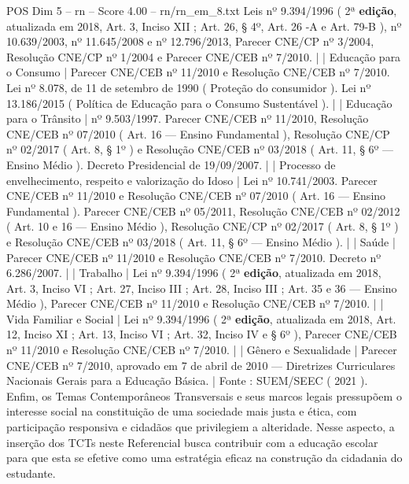 \begin{textsample}{POS Dim 5 – rn – Score 4.00 – rn/rn\_em\_8.txt}
Leis nº 9.394/1996 ( 2ª \textbf{edição}, atualizada em 2018, Art. 3, Inciso XII ; Art. 26, § 4º, Art. 26 -A e Art. 79-B ), nº 10.639/2003, nº 11.645/2008 e nº 12.796/2013, Parecer CNE/CP nº 3/2004, Resolução CNE/CP nº 1/2004 e Parecer CNE/CEB nº 7/2010. | | Educação para o Consumo | Parecer CNE/CEB nº 11/2010 e Resolução CNE/CEB nº 7/2010.
Lei nº 8.078, de 11 de setembro de 1990 ( Proteção do consumidor ).
Lei nº 13.186/2015 ( Política de Educação para o Consumo Sustentável ). | | Educação para o Trânsito | nº 9.503/1997.
Parecer CNE/CEB nº 11/2010, Resolução CNE/CEB nº 07/2010 ( Art. 16 — Ensino Fundamental ), Resolução CNE/CP nº 02/2017 ( Art. 8, § 1º ) e Resolução CNE/CEB nº 03/2018 ( Art. 11, § 6º — Ensino Médio ).
Decreto Presidencial de 19/09/2007. | | Processo de envelhecimento, respeito e valorização do Idoso | Lei nº 10.741/2003.
Parecer CNE/CEB nº 11/2010 e Resolução CNE/CEB nº 07/2010 ( Art. 16 — Ensino Fundamental ).
Parecer CNE/CEB nº 05/2011, Resolução CNE/CEB nº 02/2012 ( Art. 10 e 16 — Ensino Médio ), Resolução CNE/CP nº 02/2017 ( Art. 8, § 1º ) e Resolução CNE/CEB nº 03/2018 ( Art. 11, § 6º — Ensino Médio ). | | Saúde | Parecer CNE/CEB nº 11/2010 e Resolução CNE/CEB nº 7/2010.
Decreto nº 6.286/2007. | | Trabalho | Lei nº 9.394/1996 ( 2ª \textbf{edição}, atualizada em 2018, Art. 3, Inciso VI ; Art. 27, Inciso III ; Art. 28, Inciso III ; Art. 35 e 36 — Ensino Médio ), Parecer CNE/CEB nº 11/2010 e Resolução CNE/CEB nº 7/2010. | | Vida Familiar e Social | Lei nº 9.394/1996 ( 2ª \textbf{edição}, atualizada em 2018, Art. 12, Inciso XI ; Art. 13, Inciso VI ; Art. 32, Inciso IV e § 6º ), Parecer CNE/CEB nº 11/2010 e Resolução CNE/CEB nº 7/2010. | | Gênero e Sexualidade | Parecer CNE/CEB nº 7/2010, aprovado em 7 de abril de 2010 — Diretrizes Curriculares Nacionais Gerais para a Educação Básica. | Fonte : SUEM/SEEC ( 2021 ).
Enfim, os Temas Contemporâneos Transversais e seus marcos legais pressupõem o interesse social na constituição de uma sociedade mais justa e ética, com participação responsiva e cidadãos que privilegiem a alteridade.
Nesse aspecto, a inserção dos TCTs neste Referencial busca contribuir com a educação escolar para que esta se efetive como uma estratégia eficaz na construção da cidadania do estudante.

\end{textsample}
